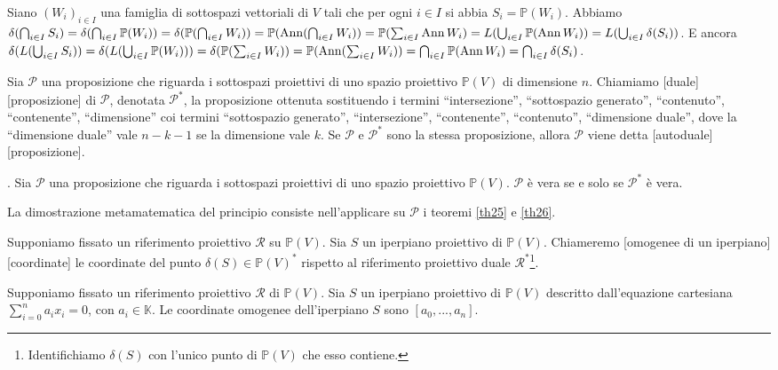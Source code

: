 \Proof Siano $(W_i)_{i \in I}$ una famiglia di sottospazi vettoriali di $V$ tali che per ogni $i \in I$ si abbia $S_i = \mathbb{P}(W_i)$. Abbiamo $\delta(\bigcap_{i \in I} S_i) = \delta(\bigcap_{i \in I} \mathbb{P}(W_i)) = \delta(\mathbb{P}(\bigcap_{i \in I} W_i)) = \mathbb{P}(\operatorname{Ann} (\bigcap_{i \in I} W_i)) = \mathbb{P}(\sum_{i \in I} \operatorname{Ann} W_i) = L(\bigcup_{i \in I} \mathbb{P}(\operatorname{Ann} W_i)) = L(\bigcup_{i \in I} \delta(S_i))$. E ancora $\delta(L(\bigcup_{i \in I} S_i)) = \delta(L(\bigcup_{i \in I} \mathbb{P}(W_i))) = \delta(\mathbb{P}(\sum_{i \in I} W_i)) = \mathbb{P}(\operatorname{Ann} (\sum_{i \in I} W_i)) = \bigcap_{i \in I} \mathbb{P}(\operatorname{Ann} W_i) = \bigcap_{i \in I} \delta(S_i)$. \EndProof
\begin{Definition}\label{def27}
	Sia $\mathcal{P}$ una proposizione che riguarda i sottospazi proiettivi di uno spazio proiettivo $\mathbb{P}(V)$ di dimensione $n$. Chiamiamo [duale][proposizione] di $\mathcal{P}$, denotata $\mathcal{P}^*$, la proposizione ottenuta sostituendo i termini ``intersezione'', ``sottospazio generato'', ``contenuto'', ``contenente'', ``dimensione'' coi termini ``sottospazio generato'', ``intersezione'', ``contenente'', ``contenuto'', ``dimensione duale'', dove la ``dimensione duale'' vale $n - k - 1$ se la dimensione vale $k$. Se $\mathcal{P}$ e $\mathcal{P}^*$ sono la stessa proposizione, allora $\mathcal{P}$ viene detta [autoduale][proposizione].
\end{Definition}
\begin{Principle}\label{princ1}
	. Sia $\mathcal{P}$ una proposizione che riguarda i sottospazi proiettivi di uno spazio proiettivo $\mathbb{P}(V)$. $\mathcal{P}$ \`e vera se e solo se $\mathcal{P}^*$ \`e vera.
\end{Principle}
\Proof La dimostrazione metamatematica del principio consiste nell'applicare su $\mathcal{P}$ i teoremi \ref{th25} e \ref{th26}. \EndProof
\begin{Definition}\label{def28}
	Supponiamo fissato un riferimento proiettivo $\mathcal{R}$ su $\mathbb{P}(V)$. Sia $S$ un iperpiano proiettivo di $\mathbb{P}(V)$. Chiameremo [omogenee di un iperpiano][coordinate] le coordinate del punto $\delta(S) \in \mathbb{P}(V)^*$ rispetto al riferimento proiettivo duale $\mathcal{R}^*$\footnote{Identifichiamo $\delta(S)$ con l'unico punto di $\mathbb{P}(V)$ che esso contiene.}.
\end{Definition}
\begin{Theorem}\label{th27}
	Supponiamo fissato un riferimento proiettivo $\mathcal{R}$ di $\mathbb{P}(V)$. Sia $S$ un iperpiano proiettivo di $\mathbb{P}(V)$ descritto dall'equazione cartesiana $\sum_{i = 0}^n a_i x_i = 0$, con $a_i \in \mathbb{K}$. Le coordinate omogenee dell'iperpiano $S$ sono $[a_0, ..., a_n]$.
\end{Theorem}
